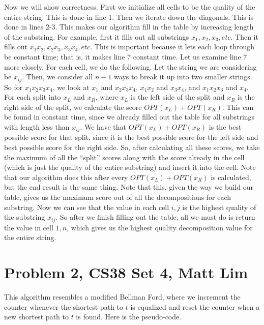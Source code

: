 \documentclass{article}
\begin{document}
Now we will show correctness. First we initialize all cells to be the quality of
the entire string. This is done in line 1. Then we iterate down the diagonals.
This is done in lines 2-3. This makes our algorithm fill in the table by
increasing length of the substring. For example, first it fills out all
substrings $x_1, x_2, x_3, etc$. Then it fills out $x_1x_2, x_2x_3, x_3x_4,
etc$. This is important because it lets each loop through be constant time; that
is, it makes line 7 constant time. Let us examine line 7 more closely. For each
cell, we do the following. Let the string we are considering be $x_{ij}$. Then,
we consider all $n-1$ ways to break it up into two smaller strings. So for
$x_1x_2x_3x_4$, we look at $x_1$ and $x_2x_3x_4$, $x_1x_2$ and $x_3x_4$, and
$x_1x_2x_3$ and $x_4$. For each split into $x_L$ and $x_R$, where $x_L$ is the
left side of the split and $x_R$ is the right side of the split, we calculate
the score $OPT(x_L) + OPT(x_R)$. This can be found in constant time, since we
already filled out the table for all substrings with length less than $x_{ij}$.
We have that $OPT(x_L) + OPT(x_R)$ is the best possible score for that split,
since it is the best possible score for the left side and best possible score
for the right side. So, after calculating all these scores, we take the maximum
of all the ``split'' scores along with the score already in the cell (which is
just the quality of the entire substring)
and insert it into the cell. Note that our algorithm does this after every
$OPT(x_L) + OPT(x_R)$ is calculated, but the end result is the same thing. Note
that this, given the way we build our table, gives us the maximum score out of
all the decompositions for each substring. Now
we can see that the value in each cell $i,j$ is the highest quality of the
substring $x_{ij}$. So after we finish filling out the table, all we must do is
return the value in cell $1,n$, which gives us the highest quality decomposition
value for the entire string.
\newpage

\section*{Problem 2, CS38 Set 4, Matt Lim}
This algorithm resembles a modified Bellman Ford, where we increment the  counter
whenever the shortest path to $t$ is equalized and reset the counter when a new
shortest path to $t$ is found. Here is the pseudo-code.
\end{document}
